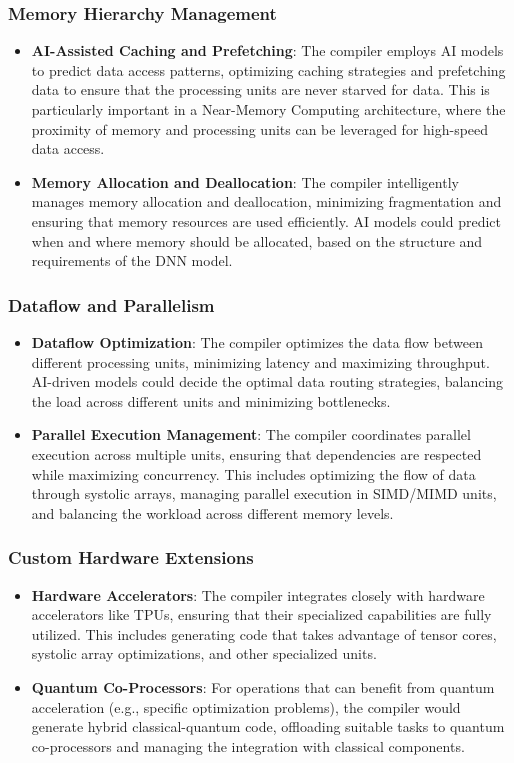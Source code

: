 \documentclass{article}
\begin{document}
\subsubsection{Memory Hierarchy Management}
\begin{itemize}
    \item \textbf{AI-Assisted Caching and Prefetching}: The compiler employs AI models to predict data access patterns, optimizing caching strategies and prefetching data to ensure that the processing units are never starved for data. This is particularly important in a Near-Memory Computing architecture, where the proximity of memory and processing units can be leveraged for high-speed data access.
    \item \textbf{Memory Allocation and Deallocation}: The compiler intelligently manages memory allocation and deallocation, minimizing fragmentation and ensuring that memory resources are used efficiently. AI models could predict when and where memory should be allocated, based on the structure and requirements of the DNN model.
\end{itemize}

\subsubsection{Dataflow and Parallelism}
\begin{itemize}
    \item \textbf{Dataflow Optimization}: The compiler optimizes the data flow between different processing units, minimizing latency and maximizing throughput. AI-driven models could decide the optimal data routing strategies, balancing the load across different units and minimizing bottlenecks.
    \item \textbf{Parallel Execution Management}: The compiler coordinates parallel execution across multiple units, ensuring that dependencies are respected while maximizing concurrency. This includes optimizing the flow of data through systolic arrays, managing parallel execution in SIMD/MIMD units, and balancing the workload across different memory levels.
\end{itemize}

\subsubsection{Custom Hardware Extensions}
\begin{itemize}
    \item \textbf{Hardware Accelerators}: The compiler integrates closely with hardware accelerators like TPUs, ensuring that their specialized capabilities are fully utilized. This includes generating code that takes advantage of tensor cores, systolic array optimizations, and other specialized units.
    \item \textbf{Quantum Co-Processors}: For operations that can benefit from quantum acceleration (e.g., specific optimization problems), the compiler would generate hybrid classical-quantum code, offloading suitable tasks to quantum co-processors and managing the integration with classical components.
\end{itemize}
\end{document}
